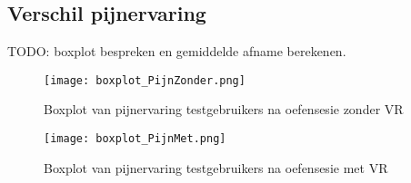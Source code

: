 \subsection{Verschil pijnervaring}

TODO: boxplot bespreken en gemiddelde afname berekenen.

\begin{figure}[h]
    \centering
    \texttt{[image: boxplot\_PijnZonder.png]}
    \caption{Boxplot van pijnervaring testgebruikers na oefensesie zonder VR}
\end{figure}

\begin{figure}[h]
    \centering
    \texttt{[image: boxplot\_PijnMet.png]}
    \caption{Boxplot van pijnervaring testgebruikers na oefensesie met VR}
\end{figure}




